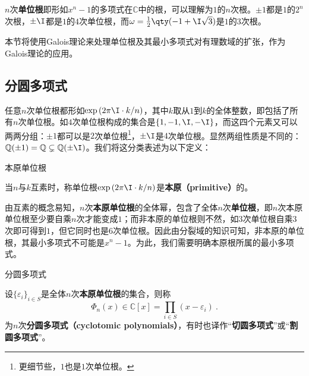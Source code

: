





$n$次\textbf{单位根}即形如$x^n-1$的多项式在$\mathbb{C}$中的根，可以理解为$1$的$n$次根。$\pm 1$都是$1$的$2^n$次根，$\pm \I$都是$1$的$4$次单位根，而$\omega=\frac{1}{2}\qty(-1+\I\sqrt{3})$是$1$的$3$次根。

本节将使用Galois理论来处理单位根及其最小多项式对有理数域的扩张，作为Galois理论的应用。


\subsection{分圆多项式}

任意$n$次单位根都形如$\exp{(2\pi\I\cdot  k/n)}$，其中$k$取从$1$到$k$的全体整数，即包括了所有$n$次单位根。如$4$次单位根构成的集合是$\{1, -1, \I, -\I\}$，而这四个元素又可以两两分组：$\pm 1$都可以是$2$次单位根\footnote{更细节些，$1$也是$1$次单位根。}，$\pm \I$是$4$次单位根。显然两组性质是不同的：$\mathbb{Q}(\pm 1)=\mathbb{Q}\subsetneq \mathbb{Q}(\pm\I)$。我们将这分类表述为以下定义：

\begin{definition}{本原单位根}\label{def_Cycltm_2}

当$n$与$k$互素时，称单位根$\exp{(2\pi\I\cdot  k/n)}$是\textbf{本原（primitive）}的。

\end{definition}

由互素的概念易知，$n$次\textbf{本原单位根}的全体幂，包含了全体$n$次\textbf{单位根}，即$n$次本原单位根至少要自乘$n$次才能变成$1$；而非本原的单位根则不然，如$3$次单位根自乘$3$次即可得到$1$，但它同时也是$6$次单位根。因此由分裂域的知识可知，非本原的单位根，其最小多项式不可能是$x^n-1$。为此，我们需要明确本原根所属的最小多项式。

\begin{definition}{分圆多项式}\label{def_Cycltm_1}

设$\{\varepsilon_i\}_{i\in S}$是全体$n$次\textbf{本原单位根}的集合，则称
\begin{equation}
\Phi_n(x)\in \mathbb{C}[x] = \prod_{i\in S}(x-\varepsilon_i)~.
\end{equation}
为$n$次\textbf{分圆多项式（cyclotomic polynomials）}，有时也译作“\textbf{切圆多项式}”或“\textbf{割圆多项式}”。

\end{definition}

